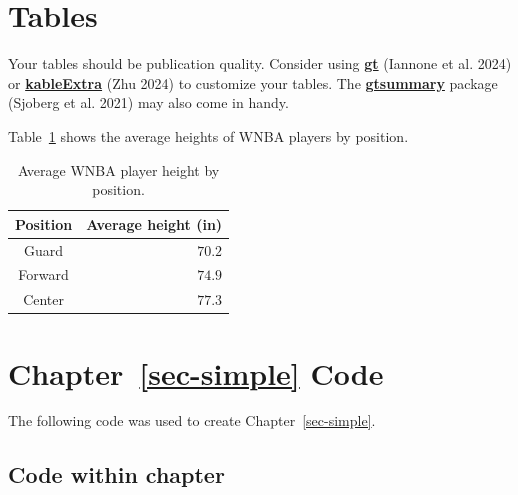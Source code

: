 \documentclass[
  11pt,
  letterpaper,
  twoside]{report}
\begin{document}
\section{Tables}\label{tables}

Your tables should be publication quality. Consider using
\href{https://gt.rstudio.com/articles/gt.html}{\textbf{gt}} (Iannone et
al. 2024) or
\href{https://cran.r-project.org/web/packages/kableExtra/vignettes/awesome_table_in_pdf.pdf}{\textbf{kableExtra}}
(Zhu 2024) to customize your tables. The
\href{https://www.danieldsjoberg.com/gtsummary/}{\textbf{gtsummary}}
package (Sjoberg et al. 2021) may also come in handy.

Table~\ref{tbl-ht-by-pos} shows the average heights of WNBA players by
position.

\begin{longtable}{cr}

\caption{\label{tbl-ht-by-pos}Average WNBA player height by position.}

\tabularnewline

\toprule
Position & Average height (in) \\ 
\midrule
Guard & $70.2$ \\ 
Forward & $74.9$ \\ 
Center & $77.3$ \\ 
\bottomrule

\end{longtable}

\section{\texorpdfstring{Chapter~\ref{sec-simple}
Code}{Chapter~ Code}}\label{sec-simple-code}

The following code was used to create Chapter~\ref{sec-simple}.

\subsection{Code within chapter}\label{code-within-chapter}
\end{document}
